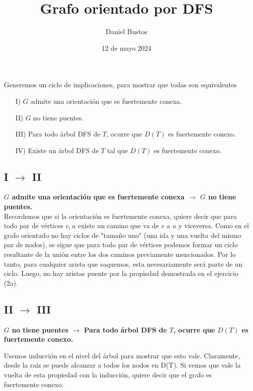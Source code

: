 \documentclass{article}
\begin{document}
\title{Grafo orientado por DFS}
\author{Daniel Bustos}
\date{12 de mayo 2024}
\maketitle

Generemos un ciclo de implicaciones, para mostrar que todas son equivalentes

\begin{enumerate}
    \item[I)] $G$ admite una orientación que es fuertemente conexa.
    \item[II)] $G$ no tiene puentes.
    \item[III)] Para todo árbol DFS de $T$, ocurre que $D(T)$ es fuertemente conexo.
    \item[IV)] Existe un árbol DFS de $T$ tal que $D(T)$ es fuertemente conexo.
\end{enumerate}

\subsection*{I $\rightarrow$ II}

\textbf{$G$ admite una orientación que es fuertemente conexa $\rightarrow$ $G$ no tiene puentes.}\\

Recordemos que si la orientación es fuertemente conexa, quiere decir que para todo par de vértices $v,u$ existe un camino que va de $v$ a $u$ y viceversa. Como en el grafo orientado no hay ciclos de "tamaño uno" (una ida y una vuelta del mismo par de nodos), se sigue que para todo par de vértices podemos formar un ciclo resultante de la unión entre los dos caminos previamente mencionados. Por lo tanto, para cualquier arista que saquemos, esta necesariamente será parte de un ciclo. Luego, no hay aristas puente por la propiedad demostrada en el ejercicio (2a).

\subsection*{II $\rightarrow$ III}

\textbf{$G$ no tiene puentes $\rightarrow$ Para todo árbol DFS de $T$, ocurre que $D(T)$ es fuertemente conexo.}

Usemos inducción en el nivel del árbol para mostrar que esto vale. Claramente, desde la raíz se puede alcanzar a todos los nodos en D(T). Si vemos que vale la vuelta de esta propiedad con la inducción, quiere decir que el grafo es fuertemente conexo.\\
\end{document}
